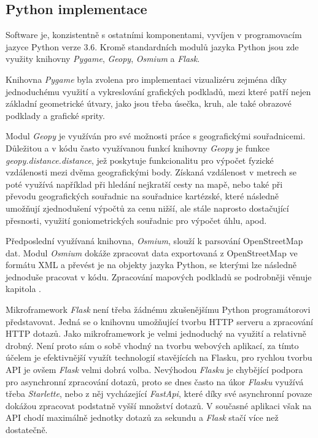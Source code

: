 \documentclass[czech,bachelor,dept460,male,cpp,cpdeclaration]{diploma}
\begin{document}
\subsection{Python implementace}

Software je, konzistentně s ostatními komponentami, vyvíjen v programovacím jazyce Python verze 3.6. Kromě standardních modulů 
jazyka Python jsou zde využity knihovny \emph{Pygame}, \emph{Geopy}, \emph{Osmium} a \emph{Flask}. 

Knihovna \emph{Pygame} byla zvolena pro implementaci vizualizéru zejména díky jednoduchému využití a vykreslování grafických 
podkladů, mezi které patří nejen základní geometrické útvary, jako jsou třeba úsečka, kruh, ale také obrazové podklady a grafické 
sprity. 

Modul \emph{Geopy} je využíván pro své možnosti práce s geografickými souřadnicemi. Důležitou a v kódu často využívanou funkcí 
knihovny \emph{Geopy} je funkce \emph{geopy.distance.distance}, jež poskytuje funkcionalitu pro výpočet fyzické vzdálenosti mezi
dvěma geografickými body. Získaná vzdálenost v metrech se poté využívá například při hledání nejkratší cesty na mapě, nebo také
při převodu geografických souřadnic na souřadnice kartézské, které následně umožňují zjednodušení výpočtů za cenu nižší, ale stále
naprosto dostačující přesnosti, využití goniometrických souřadnic pro výpočet úhlu, apod.

Předposlední využívaná knihovna, \emph{Osmium}, slouží k parsování OpenStreetMap dat. Modul \emph{Osmium} dokáže zpracovat data 
exportovaná z OpenStreetMap ve formátu XML a převést je na objekty jazyka Python, se kterými lze následně jednoduše pracovat 
v kódu. Zpracování mapových podkladů se podrobněji věnuje kapitola .

Mikroframework \emph{Flask} není třeba žádnému zkušenějšímu Python programátorovi představovat. Jedná se o knihovnu umožňující 
tvorbu HTTP serveru a zpracování HTTP dotazů. Jako mikroframework je velmi jednoduchý na využití a relativně drobný. Není proto
sám o sobě vhodný na tvorbu webových aplikací, za tímto účelem je efektivnější využít technologií stavějících na Flasku, pro
rychlou tvorbu API je ovšem \emph{Flask} velmi dobrá volba. Nevýhodou \emph{Flasku} je chybějící podpora pro asynchronní 
zpracování dotazů, proto se dnes často na úkor \emph{Flasku} využívá třeba \emph{Starlette}, nebo z něj vycházející 
\emph{FastApi}, které díky své asynchronní povaze dokážou zpracovat podstatně vyšší množství dotazů. V současné aplikaci však 
na API chodí maximálně jednotky dotazů za sekundu a \emph{Flask} stačí více než dostatečně.
\end{document}
